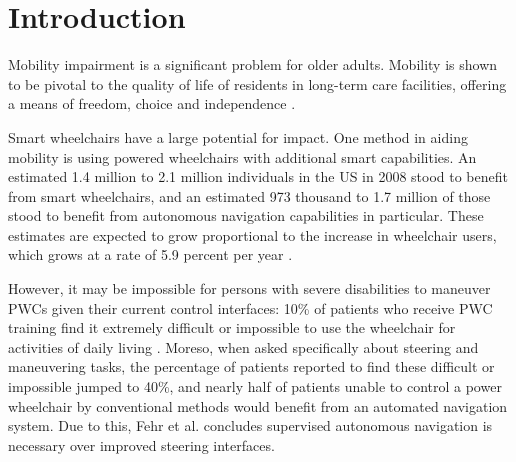 

\chapter{Introduction}
\label{ch:Introduction}






Mobility impairment is a significant problem for older adults. Mobility is
shown to be pivotal to the quality of life of residents in long-term care
facilities, offering a means of freedom, choice and independence
\cite{bourret2002meaning}.

Smart wheelchairs have a large potential for impact.
One method in aiding mobility is using powered wheelchairs with additional smart
capabilities.
An estimated 1.4 million to 2.1 million individuals in the US in 2008 stood to
benefit from smart wheelchairs, and an estimated 973 thousand to 1.7 million of
those stood to benefit from autonomous navigation capabilities in particular.
These estimates are expected to grow proportional to the increase in
wheelchair users, which grows at a rate of 5.9 percent per year
\cite{simpson2008many}.

However, it may be impossible for persons with severe disabilities to maneuver PWCs
given their current control interfaces: 10\% of patients who receive PWC training
find it extremely difficult or impossible to use the wheelchair for activities of
daily living \cite{fehr2000adequacy}.
Moreso, when asked specifically about steering and maneuvering tasks, the
percentage of patients reported to find these difficult or impossible jumped to
40\%, and nearly half of patients unable to control a power wheelchair by
conventional methods would benefit from an automated navigation system.
Due to this, Fehr et al. \cite{fehr2000adequacy} concludes supervised autonomous
navigation is necessary over improved steering interfaces.

